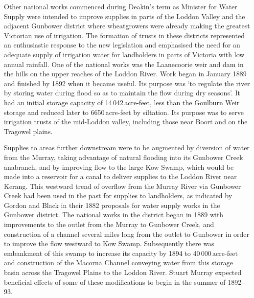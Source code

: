 Other national works commenced during Deakin's term as Minister for
Water Supply were intended to improve supplies in parts of the Loddon
Valley  and the adjacent Gunbower district where
wheatgrowers were already making the greatest Victorian use of
irrigation.  The formation of trusts in these districts represented an
enthusiastic response to the new legislation and emphasised the need
for an adequate supply of irrigation water for landholders in parts of
Victoria with low annual rainfall.  One of the national works was the
Laanecoorie weir  and dam in the hills on the
upper reaches of the Loddon River.  Work began in January 1889 and
finished by 1892 when it became useful.  Its purpose was `to regulate
the river by storing water during flood so as to maintain the flow
during dry seasons'.  It had an initial storage capacity of
14\,042\,acre-feet, less than the Goulburn Weir 
storage and reduced later to 6650\,acre-feet by siltation.  Its
purpose was to serve irrigation trusts of the mid-Loddon valley,
including those near Boort  and on the Tragowel
plains.

Supplies to areas further downstream were to be augmented by diversion
of water from the Murray, taking advantage of natural flooding into
its Gunbower Creek  anabranch, and by improving
flow to the large Kow Swamp,  which would be made
into a reservoir for a canal to deliver supplies to the Loddon River
near Kerang.   This westward trend of overflow
from the Murray River  via Gunbower Creek had been
used in the past for supplies to landholders, as indicated by Gordon
and Black in their 1882 proposals for water supply works in the
Gunbower district.  The national works in the district began in 1889
with improvements to the outlet from the Murray to Gunbower Creek, and
construction of a channel several miles long from the outlet to
Gunbower in order to improve the flow westward to Kow Swamp.
Subsequently there was embankment of this swamp to increase its
capacity by 1894 to 40\,000\,acre-feet and construction of the Macorna
Channel  conveying water from this storage
basin across the Tragowel Plains to the Loddon River.  Stuart Murray
expected beneficial effects of some of these modifications to begin in
the summer of 1892--93.


